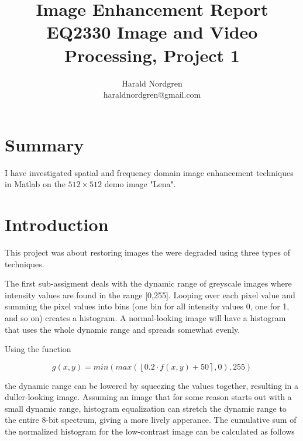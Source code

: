 \documentclass[a4paper]{article}
\begin{document}
\title{Image Enhancement Report\\
\large{EQ2330 Image and Video Processing, Project 1}}
\author{Harald Nordgren\\ haraldnordgren@gmail.com}

\maketitle

\section*{Summary}
\label{sec:summary}

I have investigated spatial and frequency domain image enhancement techniques in Matlab on the $512\times512$ demo image "Lena".


\section{Introduction}
\label{sec:introduction}

This project was about restoring images the were degraded using three types of techniques.

The first sub-assigment deals with the dynamic range of greyscale images where intensity values are found in the range [0,255]. Looping over each pixel value and summing the pixel values into bins (one bin for all intensity values 0, one for 1, and so on) creates a histogram. A normal-looking image will have a histogram that uses the whole dynamic range and spreads somewhat evenly.

Using the function

\begin{equation}
	\label{dr}
	g(x, y) = min(max(\left\lfloor 0.2 \cdot  f (x, y) + 50 \right \rceil, 0), 255)
\end{equation}

the dynamic range can be lowered by squeezing the values together, resulting in a duller-looking image. Assuming an image that for some reason starts out with a small dynamic range, histogram equalization can stretch the dynamic range to the entire 8-bit spectrum, giving a more lively apperance. The cumulative sum of the normalized histogram for the low-contrast image can be calculated as follows
\end{document}

